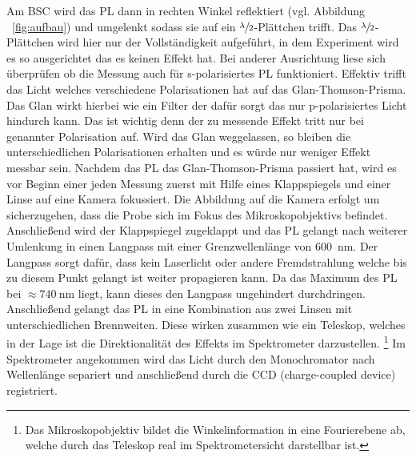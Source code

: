 Am BSC wird das PL dann in rechten Winkel reflektiert (vgl. Abbildung ~\ref{fig:aufbau}) und umgelenkt sodass sie 
auf ein $\sfrac{\lambda}{2}$-Plättchen trifft.
Das $\sfrac{\lambda}{2}$-Plättchen wird hier nur der Vollständigkeit aufgeführt, in dem Experiment
wird es so ausgerichtet das es keinen Effekt hat. 
Bei anderer Ausrichtung liese sich überprüfen ob die Messung auch für s-polarisiertes PL
funktioniert.
Effektiv trifft das Licht welches verschiedene Polarisationen hat auf das Glan-Thomson-Prisma.
Das Glan wirkt hierbei wie ein Filter der dafür sorgt das nur p-polarisiertes Licht hindurch kann.
Das ist wichtig denn der zu messende Effekt tritt nur bei genannter Polarisation auf.
Wird das Glan weggelassen, so bleiben die unterschiedlichen Polarisationen erhalten
und es würde nur weniger Effekt messbar sein. 
Nachdem das PL das Glan-Thomson-Prisma passiert hat, wird es vor Beginn einer jeden Messung zuerst
mit Hilfe eines Klappspiegels und einer Linse auf eine Kamera fokussiert. 
Die Abbildung auf die Kamera erfolgt um sicherzugehen, dass die Probe sich im Fokus des 
Mikroskopobjektivs befindet.
Anschließend wird der Klappspiegel zugeklappt und das PL gelangt nach weiterer Umlenkung in einen 
Langpass mit einer Grenzwellenlänge von \SI{600}{\nano\meter}. 
Der Langpass sorgt dafür, dass kein Laserlicht oder andere Fremdstrahlung
welche bis zu diesem Punkt gelangt ist weiter propagieren kann. 
Da das Maximum des PL bei $\approx \SI{740}{\nano\meter}$ liegt, 
kann dieses den Langpass ungehindert durchdringen.
Anschließend gelangt das PL in eine Kombination aus zwei Linsen mit unterschiedlichen Brennweiten.
Diese wirken zusammen wie ein Teleskop, welches in der Lage ist die Direktionalität des Effekts 
im Spektrometer darzustellen.
\footnote{Das Mikroskopobjektiv bildet die Winkelinformation in eine Fourierebene ab,
welche durch das Teleskop real im Spektrometersicht darstellbar ist.} 
Im Spektrometer angekommen wird das Licht durch den Monochromator nach Wellenlänge separiert und 
anschließend durch die CCD (charge-coupled device) registriert.

